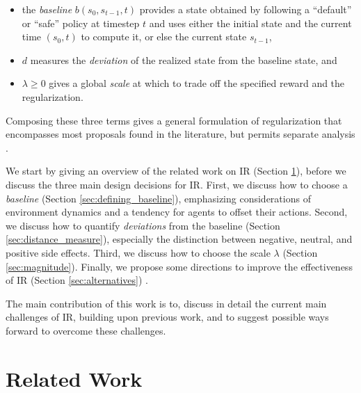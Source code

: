 \documentclass[letterpaper]{article} %
\begin{document}
\begin{itemize}
\item the \emph{baseline} $b(s_0, s_{t-1}, t)$ provides a state obtained by following a ``default'' or ``safe'' policy at timestep $t$ and uses either the initial state and the current time $(s_0, t)$ to compute it, or else the current state $s_{t-1}$,
\item $d$ measures the \emph{deviation}
of the realized state from the baseline state, and
\item  $\lambda \ge 0$ gives a global \emph{scale} at which to trade off the specified reward and the regularization.
\end{itemize}
Composing these three terms gives a general formulation of regularization that encompasses most proposals found in the literature, but permits separate analysis \citep{krakovna2018penalizing}.

We start by giving an overview of the related work on IR (Section \ref{sec:related_work}), before we discuss the three main design decisions for IR.  First, we discuss how to choose a \emph{baseline} (Section \ref{sec:defining_baseline}), emphasizing considerations of environment dynamics and a tendency for agents to offset their actions.
Second, we discuss how to quantify \emph{deviations} from the baseline (Section \ref{sec:distance_measure}), especially the distinction between negative, neutral, and positive side effects. Third, we discuss how to choose the scale $\lambda$ (Section \ref{sec:magnitude}). Finally, we propose some directions to improve the effectiveness of IR (Section \ref{sec:alternatives}) .

The main contribution of this work is to, discuss in detail the current main challenges of IR, building upon previous work, and to suggest possible ways forward to overcome these challenges.

\section{Related Work}
\label{sec:related_work}
\end{document}
